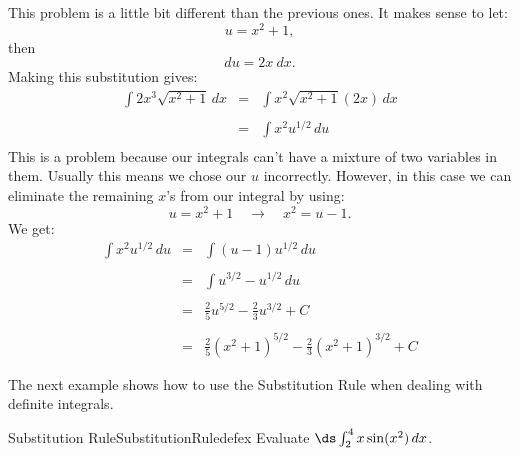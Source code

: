 \begin{solution} 
This problem is a little bit different than the previous ones.
It makes sense to let:
$$u=x^2+1,$$
then
$$du=2x~dx.$$
Making this substitution gives:
\begin{eqnarray*}
\int 2x^3\sqrt{x^2+1}\,dx&=&\int x^2\sqrt{x^2+1}(2x)\,dx\\
\\
&=&\int x^2u^{1/2}\,du\\
\end{eqnarray*}
This is a problem because our integrals can't have a mixture of two variables in them.
Usually this means we chose our $u$ incorrectly.
However, in this case we can eliminate the remaining $x$'s from our integral by using:
$$u=x^2+1\quad\to\quad x^2=u-1.$$
We get:
\begin{eqnarray*}
\int x^2u^{1/2}\,du&=&\int (u-1)u^{1/2}\,du\\
\\
&=&\int u^{3/2}-u^{1/2}\,du\\
\\
&=&\frac{2}{5}u^{5/2}-\frac{2}{3}u^{3/2}+C\\
\\
&=&\frac{2}{5}(x^2+1)^{5/2}-\frac{2}{3}(x^2+1)^{3/2}+C
\end{eqnarray*}
\end{solution}

The next example shows how to use the Substitution Rule when dealing with definite integrals.

\begin{example}{Substitution Rule}{SubstitutionRuledefex}
Evaluate $\ds\int_2^4 x\sin(x^2)\,dx$. 
\end{example}

